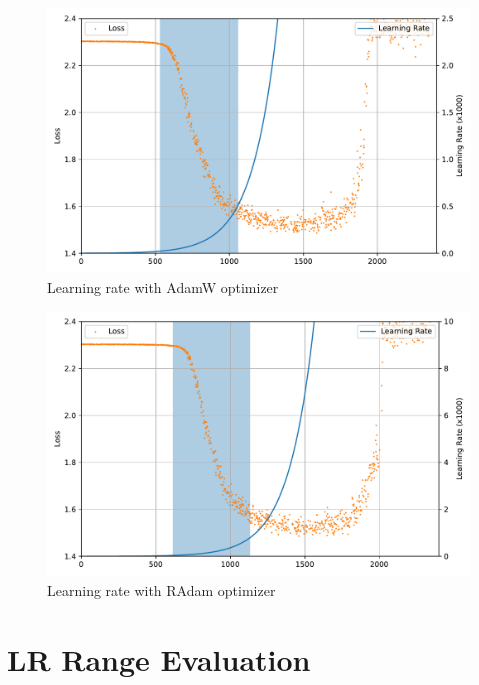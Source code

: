 \documentclass{article}
\begin{document}
\begin{figure}[ht!]
    \centering
    \includegraphics[scale=0.64]{images/lr_range_adamw.pdf}
    \caption{Learning rate with AdamW optimizer}\label{fig:lr_range_adamw}
\end{figure}

\begin{figure}[ht!]
    \centering
    \includegraphics[scale=0.64]{images/lr_range_radam.pdf}
    \caption{Learning rate with RAdam optimizer}\label{fig:lr_range_radam}
\end{figure}

\clearpage
\section{LR Range Evaluation}
\end{document}
